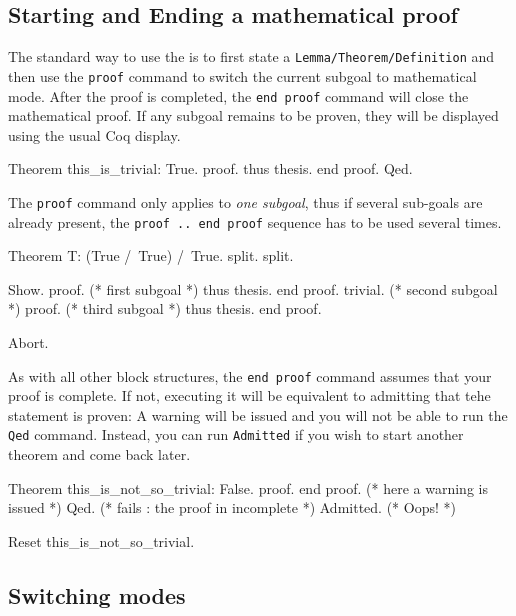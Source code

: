 \subsection{Starting and Ending a mathematical proof}

 The standard way to use the \DPL{} is to first state a {\texttt{Lemma/Theorem/Definition}} and then use the {\texttt{proof}} command to switch the current subgoal to mathematical mode.  After the proof is completed, the {\texttt{end proof}} command will close the mathematical proof. If any subgoal remains to be proven, they will be displayed using the usual Coq display.

\begin{coq_example}
Theorem this_is_trivial: True.
proof.
  thus thesis.
end proof.
Qed.
\end{coq_example}

The {\texttt{proof}} command only applies to \emph{one subgoal}, thus
if several sub-goals are already present, the {\texttt{proof .. end
    proof}} sequence has to be used several times.

\begin{coq_eval}
Theorem T: (True /\ True) /\ True.
  split. split.
\end{coq_eval}
\begin{coq_example}
  Show.
  proof. (* first subgoal *)
    thus thesis.
  end proof.
  trivial. (* second subgoal *)
  proof. (* third subgoal *)
    thus thesis.
  end proof.
\end{coq_example}
\begin{coq_eval}
Abort.
\end{coq_eval}

As with all other block structures, the {\texttt{end proof}} command
assumes that your proof is complete. If not, executing it will be
equivalent to admitting that tehe statement is proven: A warning will
be issued and you will not be able to run the {\texttt{Qed}}
command. Instead, you can run {\texttt{Admitted}} if you wish to start
another theorem and come back
later.

\begin{coq_example}
Theorem this_is_not_so_trivial: False.
proof.
end proof. (* here a warning is issued *)
Qed. (* fails : the proof in incomplete *)
Admitted. (* Oops! *)
\end{coq_example}
\begin{coq_eval}
Reset this_is_not_so_trivial.   
\end{coq_eval}

\subsection{Switching modes}

